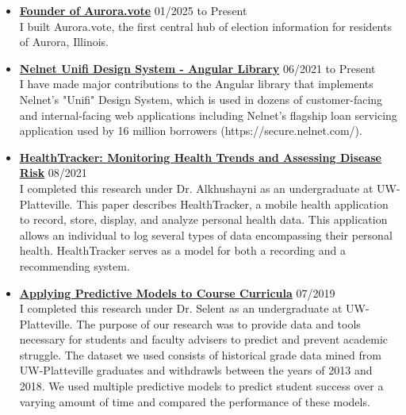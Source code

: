 \documentclass[11pt]{article}
\newcommand{\project}[3]{\vspace{1.5mm}
  \textbf{#1} \hfill #2 #3
}
\begin{document}
\begin{itemize}[leftmargin=*]
	\item[]
	      \project
	      {\href{https://aurora.vote/}{Founder of Aurora.vote}}
	      {01/2025 to Present}
	      {\\I built Aurora.vote, the first central hub of election information for residents of Aurora, Illinois.}
	\item[]
	      \project
	      {\href{https://angular.unifi.nelnet.io/}{Nelnet Unifi Design System - Angular Library}}
	      {06/2021 to Present}
	      {\\I have made major contributions to the Angular library that implements Nelnet's "Unifi" Design System, which is used in dozens of customer-facing and internal-facing web applications including Nelnet's flagship loan servicing application used by 16 million borrowers (https://secure.nelnet.com/).}
	\item[]
	      \project
	      {\href{https://www.researchgate.net/publication/349682373_Health_tracker_data_acquisition_and_analysis_for_monitoring_health_trends_and_assessing_disease_risk}{HealthTracker: Monitoring Health Trends and Assessing Disease Risk}}
	      {08/2021}
	      {\\I completed this research under Dr. Alkhushayni as an undergraduate at UW-Platteville. This paper describes HealthTracker, a mobile health application to record, store, display, and analyze personal health data. This application allows an individual to log several types of data encompassing their personal health. HealthTracker serves as a model for both a recording and a recommending system.}
	\item[]
	      \project
	      {\href{https://afitz.space/files/2019_WSTS_Poster.pdf}{Applying Predictive Models to Course Curricula}}
	      {07/2019}
	      {\\I completed this research under Dr. Selent as an undergraduate at UW-Platteville. The purpose of our research was to provide data and tools necessary for students and faculty advisers to predict and prevent academic struggle. The dataset we used consists of historical grade data mined from UW-Platteville graduates and withdrawls between the years of 2013 and 2018. We used multiple predictive models to predict student success over a varying amount of time and compared the performance of these models.}
\end{itemize}
\ 
\end{document}

